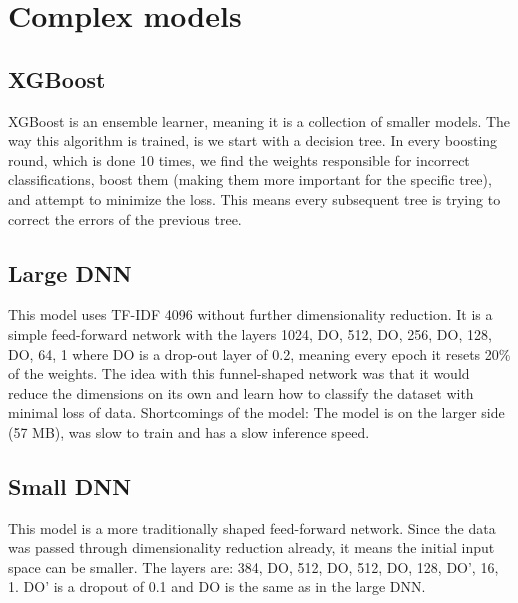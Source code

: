\section{Complex models}
\subsection{XGBoost}
XGBoost is an ensemble learner, meaning it is a collection of smaller models. The way this algorithm is trained, is we start with a decision tree. In every boosting round, which is done 10 times, we find the weights responsible for incorrect classifications, boost them (making them more important for the specific tree), and attempt to minimize the loss. This means every subsequent tree is trying to correct the errors of the previous tree.

\subsection{Large DNN}
This model uses TF-IDF 4096 without further dimensionality reduction. It is a simple feed-forward network with the layers 1024, DO, 512, DO, 256, DO, 128, DO, 64, 1 where DO is a drop-out layer of 0.2, meaning every epoch it resets 20\% of the weights. The idea with this funnel-shaped network was that it would reduce the dimensions on its own and learn how to classify the dataset with minimal loss of data. Shortcomings of the model: The model is on the larger side (57 MB), was slow to train and has a slow inference speed.

\subsection{Small DNN}
This model is a more traditionally shaped feed-forward network. Since the data was passed through dimensionality reduction
already, it means the initial input space can be smaller. The layers are: 384, DO, 512, DO, 512, DO, 128, DO', 16, 1.
DO' is a dropout of 0.1 and DO is the same as in the large DNN.
